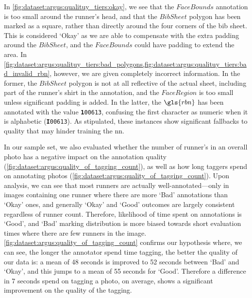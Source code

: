 In \cref{fig:dataset:argus:qualituy_tiers:okay}, we see that the $FaceBounds$ annotation is too small around the runner's head, and that the $BibSheet$ polygon has been marked as a square, rather than directly around the four corners of the bib sheet. This is considered `Okay' as we are able to compensate with the extra padding around the $BibSheet$, and the $FaceBounds$ could have padding to extend the area. In \cref{fig:dataset:argus:qualituy_tiers:bad_polygons,fig:dataset:argus:qualituy_tiers:bad_invalid_rbn}, however, we are given completely incorrect information. In the former, the $BibSheet$ polygon is not at all reflective of the actual sheet, including part of the runner's shirt in the annotation, and the $FaceRegion$ is too small unless significant padding is added. In the latter, the $\gls{rbn}$ has been annotated with the value \texttt{\textbf{1}00613}, confusing the first character as numeric when it is alphabetic (\texttt{\textbf{I}00613}). As stipulated, these instances show significant fallbacks to quality that may hinder training the \gls{nn}.

In our sample set, we also evaluated whether the number of runner's in an overall photo has a negative impact on the annotation quality (\cref{fig:dataset:argus:quality_of_tagging_count}), as well as how long taggers spend on annotating photos (\cref{fig:dataset:argus:quality_of_tagging_count}). Upon analysis, we can see that most runners are actually well-annotated---only in images containing one runner where there are more `Bad' annotations than `Okay' ones, and generally `Okay' and `Good' outcomes are largely consistent regardless of runner count. Therefore, likelihood of time spent on annotations is `Good', and `Bad' marking distribution is more biased towards short evaluation times where there are few runners in the image. \cref{fig:dataset:argus:quality_of_tagging_count} confirms our hypothesis where, we can see, the longer the annotator spend time tagging, the better the quality of our data is: a mean of 48 seconds is improved to 52 seconds between `Bad' and `Okay', and this jumps to a mean of 55 seconds for `Good'. Therefore a difference in 7 seconds spend on tagging a photo, on average, shows a significant improvement on the quality of the tagging.

